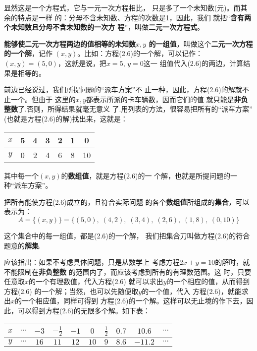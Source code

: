 显然这是一个方程式，它与一元一次方程相比，
只是多了一个未知数(元)。而其余的特点是一样
的：分母不含未知数、方程的次数是1，因此，我们
就把“\textbf{含有两个未知数且分母不含未知数的一次方
程}”，叫做\textbf{二元一次方程式}。

\textbf{能够使二元一次方程两边的值相等的未知数$x,y$
的一组值}，叫做这个\textbf{二元一次方程的一个解}，记作
$(x,y)$。比如：方程(2.6)的一个解，可以记作：
 $ (x,   y)=(5,  0)$，这就是说，把$x=5$, $y=0$这一
组值代入(2.6)的两边，计算结果是相等的。

    前边已经说过，我们所提问题的“派车方案”不
止一种，因此，方程(2.6)的解就不止一个。但由于
这里的$x,  y$都表示所派的卡车辆数，因而它们的值
就只能是\textbf{非负整数}了.否则，所得结果就毫无意义
了.用列表的方法，很容易把所有的“派车方案”
  (也就是方程(2.6)的解)找出来，这就是：
\begin{center}
    \begin{tabular}{c|cccccc}
        \hline
  $x$ &5&4&3&2&1&0\\
  \hline    
  $y$ &0&2&4&6&8&10\\
  \hline
    \end{tabular}
\end{center}
其中每一个$(x,y)$的\textbf{数组值}，就是方程(2.6)的一
个解，也就是所提问题的一种“派车方案”。

    把所有能使方程(2.6)成立的，且符合实际问题
的各个\textbf{数组值}所组成的\textbf{集合}，可以表示为：
\[A=\{(x,y)\}=\{(5,0),\; (4,2),\;(3,4),\;(2,6),\;(1,8),\;(0,10)\}\]

这个集合中的每一组值，都是(2.6)的一个解，
我们把集合刀叫做方程(2.6)的符合题意的\textbf{解集}.

    应该指出：如果不考虑具体问题，只是从数学上
考虑方程$2x + y=10$的解时，就不能限制在\textbf{非负整数}
的范围内了，而应该考虑到所有的有理数范围。这
时，只要任意取$x$的一个有理数值，代入方程(2.6)
就可以求出$y$的一个相应的值，从而得到方程(2.6)
的一个解；当然，也可以先随便取$y$的一个值，代入
方程(2.6)，就能求出$x$的一个相应值，同样可得到
方程(2.6)的一个解。这样可以无止境的作下去，因
此，可以得到方程(2.6)的无限多个解。如下表：
\begin{center}
    \begin{tabular}{c|ccccccccc}
        \hline
  $x$ &$\cdots$& $-3$ & $-\frac{1}{2}$  & $-1$  & $0$  & $\frac{1}{2}$ & $0.7$ &$10.6$  &$\cdots$\\
  \hline    
  $y$ &$\cdots$& $16$ & $11$  & $12$  &  $10$ & $9$ & $8.6$  &$-11.2$ &$\cdots$\\
  \hline
    \end{tabular}
\end{center}

